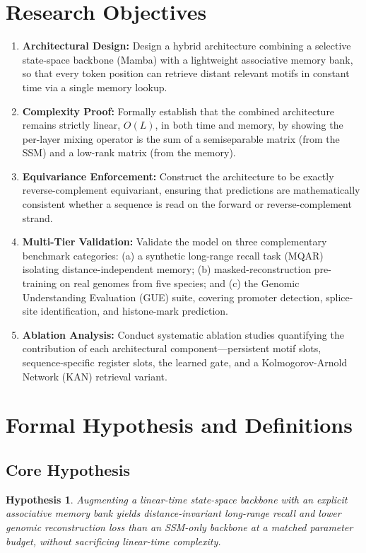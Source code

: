 \documentclass[11pt,a4paper]{article}
\newtheorem{hypothesis}{Hypothesis}
\begin{document}
\section{Research Objectives}
\begin{enumerate}[label=\textbf{O\arabic*.}, leftmargin=2.2cm, itemsep=6pt]
    \item \textbf{Architectural Design:} Design a hybrid architecture combining a selective state-space backbone (Mamba) with a lightweight associative memory bank, so that every token position can retrieve distant relevant motifs in constant time via a single memory lookup.
    \item \textbf{Complexity Proof:} Formally establish that the combined architecture remains strictly linear, $O(L)$, in both time and memory, by showing the per-layer mixing operator is the sum of a semiseparable matrix (from the SSM) and a low-rank matrix (from the memory).
    \item \textbf{Equivariance Enforcement:} Construct the architecture to be exactly reverse-complement equivariant, ensuring that predictions are mathematically consistent whether a sequence is read on the forward or reverse-complement strand.
    \item \textbf{Multi-Tier Validation:} Validate the model on three complementary benchmark categories: (a) a synthetic long-range recall task (MQAR) isolating distance-independent memory; (b) masked-reconstruction pre-training on real genomes from five species; and (c) the Genomic Understanding Evaluation (GUE) suite, covering promoter detection, splice-site identification, and histone-mark prediction.
    \item \textbf{Ablation Analysis:} Conduct systematic ablation studies quantifying the contribution of each architectural component—persistent motif slots, sequence-specific register slots, the learned gate, and a Kolmogorov-Arnold Network (KAN) retrieval variant.
\end{enumerate}

\section{Formal Hypothesis and Definitions}
\subsection{Core Hypothesis}
\begin{hypothesis}
Augmenting a linear-time state-space backbone with an explicit associative memory bank yields distance-invariant long-range recall and lower genomic reconstruction loss than an SSM-only backbone at a matched parameter budget, without sacrificing linear-time complexity.
\end{hypothesis}
\end{document}
